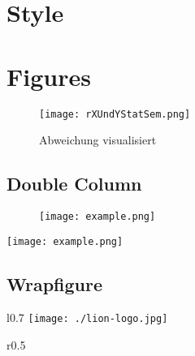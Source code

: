 \section{Style}
\usepackage[doublespacing]{setspace} %

\section{Figures}

\begin{figure}[H]
  \centering
  \texttt{[image: rXUndYStatSem.png]}
  \caption{Abweichung visualisiert\cite{statistikSeminar}}
  \label{fig:rUndXY}
\end{figure}

\subsection{Double Column}

\begin{figure}[tbp]
	\centering\texttt{[image: example.png]}
\end{figure}

\begin{figure*}[tbp]
	\centering\texttt{[image: example.png]}
\end{figure*}

\subsection{Wrapfigure}

\begin{wrapfigure}{l}{0.7\linewidth}
  \texttt{[image: ./lion-logo.jpg]}
  \caption{This is the former Share\LaTeX{} logo}
  \label{fig:_name_}
\end{wrapfigure}

\begin{wrapfigure}{r}{0.5\textwidth}
    \vspace{-25pt}
    \vspace{-20pt}
  \caption{Triangulation \cite{poleTagging}}
  \label{fig:triang}
    \vspace{-6pt}
\end{wrapfigure}

